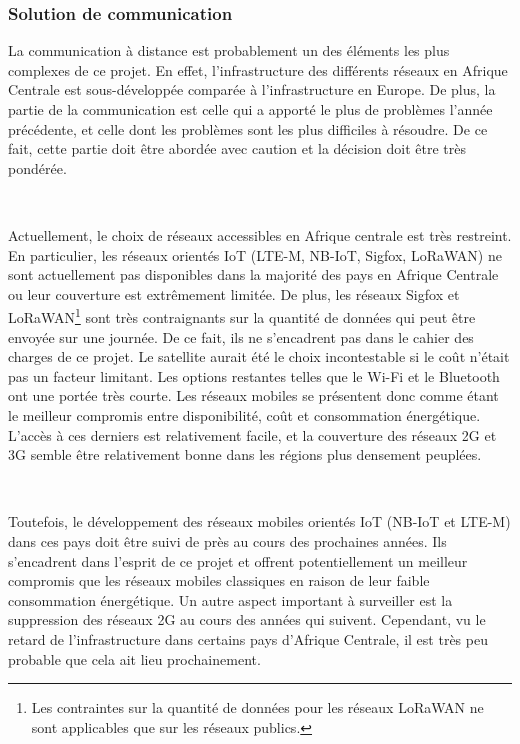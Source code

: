 \subsubsection{Solution de communication}

\noindent
La communication à distance est probablement un des éléments les plus complexes de ce projet. En effet, l'infrastructure des différents réseaux en Afrique Centrale est sous-développée comparée à l'infrastructure en Europe. De plus, la partie de la communication est celle qui a apporté le plus de problèmes l'année précédente, et celle dont les problèmes sont les plus difficiles à résoudre. De ce fait, cette partie doit être abordée avec caution et la décision doit être très pondérée.

~

\noindent
Actuellement, le choix de réseaux accessibles en Afrique centrale est très restreint. En particulier, les réseaux orientés IoT (LTE-M, NB-IoT, Sigfox, LoRaWAN) ne sont actuellement pas disponibles dans la majorité des pays en Afrique Centrale ou leur couverture est extrêmement limitée.
De plus, les réseaux Sigfox et LoRaWAN\footnote{Les contraintes sur la quantité de données pour les réseaux LoRaWAN ne sont applicables que sur les réseaux publics.} sont très contraignants sur la quantité de données qui peut être envoyée sur une journée. De ce fait, ils ne s'encadrent pas dans le cahier des charges de ce projet. Le satellite aurait été le choix incontestable si le coût n'était pas un facteur limitant. Les options restantes telles que le Wi-Fi et le Bluetooth ont une portée très courte.  Les réseaux mobiles se présentent donc comme étant le meilleur compromis entre disponibilité, coût et consommation énergétique. L'accès à ces derniers est relativement facile, et la couverture des réseaux 2G et 3G semble être relativement bonne dans les régions plus densement peuplées. \cite{coverage_airtel, coverage_orange}


~

\noindent
Toutefois, le développement des réseaux mobiles orientés IoT (NB-IoT et LTE-M) dans ces pays doit être suivi de près au cours des prochaines années. Ils s'encadrent dans l'esprit de ce projet et offrent potentiellement un meilleur compromis que les réseaux mobiles classiques en raison de leur faible consommation énergétique.  Un autre aspect important à surveiller est la suppression des réseaux 2G au cours des années qui suivent. Cependant, vu le retard de l'infrastructure dans certains pays d'Afrique Centrale, il est très peu probable que cela ait lieu prochainement.

